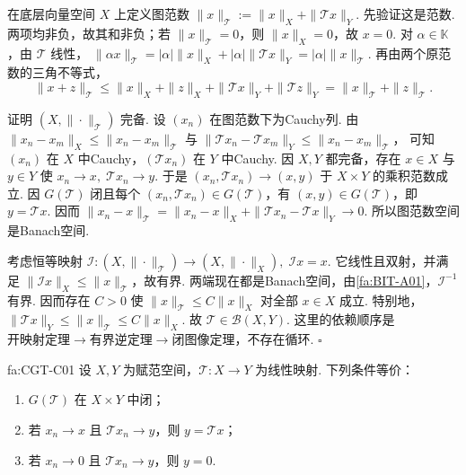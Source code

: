 \begin{FAProof}
在底层向量空间 \(\displaystyle X\) 上定义图范数
\(\displaystyle \|x\|_{\mathcal T}:=\|x\|_X+\|\mathcal T x\|_Y\).
先验证这是范数. 两项均非负，故其和非负；若 \(\displaystyle \|x\|_{\mathcal T}=0\)，则 \(\displaystyle \|x\|_X=0\)，故 \(\displaystyle x=0\). 对 \(\displaystyle \alpha\in\mathbb K\)，由 \(\displaystyle \mathcal T\) 线性，
\(\displaystyle \|\alpha x\|_{\mathcal T} =|\alpha|\|x\|_X+|\alpha|\|\mathcal T x\|_Y =|\alpha|\|x\|_{\mathcal T}\).
再由两个原范数的三角不等式，
\[
\|x+z\|_{\mathcal T}
\leqslant\|x\|_X+\|z\|_X+\|\mathcal T x\|_Y+\|\mathcal T z\|_Y
=\|x\|_{\mathcal T}+\|z\|_{\mathcal T}.
\]

证明 \(\displaystyle (X,\|\cdot\|_{\mathcal T})\) 完备. 设 \(\displaystyle (x_n)\) 在图范数下为Cauchy列. 由
\(\displaystyle \|x_n-x_m\|_X\leqslant\|x_n-x_m\|_{\mathcal T}\)
与
\(\displaystyle \|\mathcal T x_n-\mathcal T x_m\|_Y \leqslant\|x_n-x_m\|_{\mathcal T}\)，
可知 \(\displaystyle (x_n)\) 在 \(\displaystyle X\) 中Cauchy，\(\displaystyle (\mathcal T x_n)\) 在 \(\displaystyle Y\) 中Cauchy. 因 \(\displaystyle X,Y\) 都完备，存在 \(\displaystyle x\in X\) 与 \(\displaystyle y\in Y\) 使
\(\displaystyle x_n\to x, \; \mathcal T x_n\to y\).
于是 \(\displaystyle (x_n,\mathcal T x_n)\to(x,y)\) 于 \(\displaystyle X\times Y\) 的乘积范数成立.
因 \(\displaystyle G(\mathcal T)\) 闭且每个 \(\displaystyle (x_n,\mathcal T x_n)\in G(\mathcal T)\)，有 \(\displaystyle (x,y)\in G(\mathcal T)\)，即 \(\displaystyle y=\mathcal T x\). 因而
\(\displaystyle \|x_n-x\|_{\mathcal T} =\|x_n-x\|_X+\|\mathcal T x_n-\mathcal T x\|_Y \to0\).
所以图范数空间是Banach空间.

考虑恒等映射
\(\displaystyle \mathcal I:(X,\|\cdot\|_{\mathcal T})\to(X,\|\cdot\|_X), \; \mathcal Ix=x\).
它线性且双射，并满足 \(\displaystyle \|\mathcal Ix\|_X\leqslant\|x\|_{\mathcal T}\)，故有界. 两端现在都是Banach空间，由\autoref{fa:BIT-A01}，\(\displaystyle \mathcal I^{-1}\) 有界. 因而存在 \(\displaystyle C>0\) 使
\(\displaystyle \|x\|_{\mathcal T}\leqslant C\|x\|_X\)
对全部 \(\displaystyle x\in X\) 成立. 特别地，
\(\displaystyle \|\mathcal T x\|_Y \leqslant\|x\|_{\mathcal T} \leqslant C\|x\|_X\).
故 \(\displaystyle \mathcal T\in\mathcal B(X,Y)\). 这里的依赖顺序是 \(\displaystyle \text{开映射定理}\to\text{有界逆定理}\to\text{闭图像定理}\)，不存在循环.
\hfill\(\square\)
\end{FAProof}

\begin{FAProposition}[C][闭图像的序列判据]{fa:CGT-C01}
设 \(\displaystyle X,Y\) 为赋范空间，\(\displaystyle \mathcal T:X\to Y\) 为线性映射. 下列条件等价：
\begin{enumerate}[label=\textup{(\roman*)}]
\item \(\displaystyle G(\mathcal T)\) 在 \(\displaystyle X\times Y\) 中闭；
\item 若 \(\displaystyle x_n\to x\) 且 \(\displaystyle \mathcal T x_n\to y\)，则 \(\displaystyle y=\mathcal T x\)；
\item 若 \(\displaystyle x_n\to0\) 且 \(\displaystyle \mathcal T x_n\to y\)，则 \(\displaystyle y=0\).
\end{enumerate}
\end{FAProposition}

